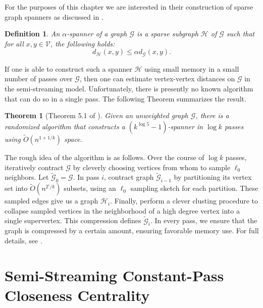 \documentclass[10]{report}
\newtheorem{theorem}{Theorem}[section]
\newtheorem{definition}{Definition}[section]
\begin{document}
For the purposes of this chapter we are interested in their construction of sparse graph spanners as discussed in \cite{ahn2012graph}. 
%
\begin{definition}
An $\alpha$-spanner of a graph $\mathcal{G}$ is a sparse subgraph $\mathcal{H}$ of $\mathcal{G}$ such that for all $x,y \in \mathcal{V}$, the following holds: 
\begin{equation} \label{eq:spanner}
d_\mathcal{H}(x,y) \leq \alpha d_\mathcal{G}(x,y).
\end{equation}
\end{definition}
%
If one is able to construct such a spanner $\mathcal{H}$ using small memory in a small number of passes over $\mathcal{G}$, then one can estimate vertex-vertex distances on $\mathcal{G}$ in the semi-streaming model. 
Unfortunately, there is presently no known algorithm that can do so in a single pass. 
The following Theorem summarizes the result.
%
\begin{theorem}[Theorem 5.1 of \cite{ahn2012graph}] \label{thm:spanner}
Given an unweighted graph $\mathcal{G}$, there is a randomized algorithm that constructs a $(k^{\log 5}-1)$-spanner in $\log k$ passes using $\widetilde{O}(n^{1+1/k})$ space. 
\end{theorem}
%
The rough idea of the algorithm is as follows.
Over the course of $\log k$ passes, iteratively contract $\mathcal{G}$ by cleverly choosing vertices from whom to sample $\ell_0$ neighbors.
Let $\widetilde{\mathcal{G}}_0 = \mathcal{G}$. 
In pass $i$, contract graph $\widetilde{\mathcal{G}}_{i-1}$ by partitioning its vertex set into $\widetilde{O}(n^{2^i/k})$ subsets, using an $\ell_0$ sampling sketch for each partition. 
These sampled edges give us a graph $\mathcal{H}_i$. 
Finally, perform a clever clusting procedure to collapse sampled vertices in the neighborhood of a high degree vertex into a single supervertex.
This compression defines $\widetilde{\mathcal{G}}_i$. 
In every pass, we ensure that the graph is compressed by a certain amount, ensuring favorable memory use.
For full details, see \cite{ahn2012graph}.


\section{Semi-Streaming Constant-Pass Closeness Centrality} \label{sec:sscc}
\end{document}
